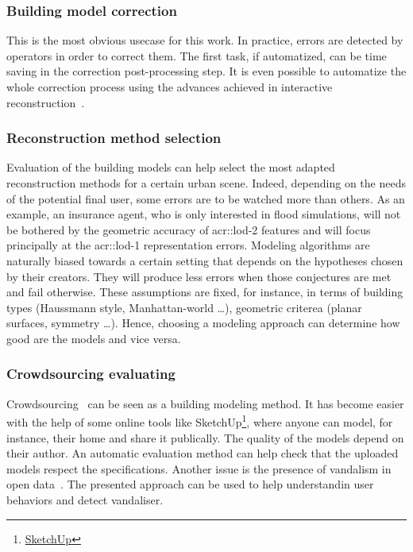         \subsubsection{Building model correction}
            This is the most obvious usecase for this work.
            In practice, errors are detected by operators in order to correct them.
            The first task, if automatized, can be time saving in the correction post-processing step.
            It is even possible to automatize the whole correction process using the advances achieved in interactive reconstruction~\parencite{kowdle2011active}.

        \subsubsection{Reconstruction method selection}
            Evaluation of the building models can help select the most adapted reconstruction methods for a certain urban scene.
            Indeed, depending on the needs of the potential final user, some errors are to be watched more than others.
            As an example, an insurance agent, who is only interested in flood simulations, will not be bothered by the geometric accuracy of \gls{acr::lod}-2 features and will focus principally at the \gls{acr::lod}-1 representation errors.
            Modeling algorithms are naturally biased towards a certain setting that depends on the hypotheses chosen by their creators.
            They will produce less errors when those conjectures are met and fail otherwise.
            These assumptions are fixed, for instance, in terms of building types (Haussmann style, Manhattan-world \dots), geometric criterea (planar surfaces, symmetry \dots).
            Hence, choosing a modeling approach can determine how good are the models and vice versa.

        \subsubsection{Crowdsourcing evaluating}
            Crowdsourcing~\parencite{kovashka2016crowdsourcing} can be seen as a building modeling method.
            It has become easier with the help of some online tools like SketchUp\footnote{
                \href{https://www.sketchup.com}{SketchUp}
            }, where anyone can model, for instance, their home and share it publically.
            The quality of the models depend on their author.
            An automatic evaluation method can help check that the uploaded models respect the specifications.
            Another issue is the presence of vandalism in open data~\parencite{neis2012towards}.
            The presented approach can be used to help understandin user behaviors and detect vandaliser.

